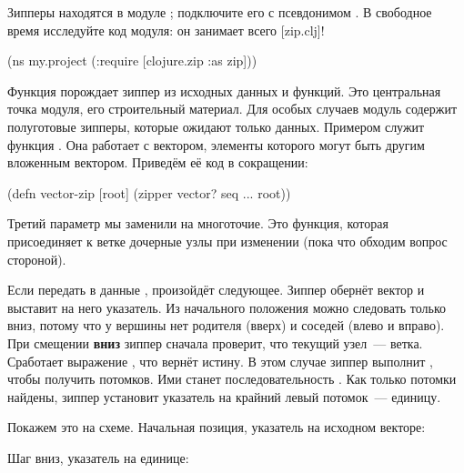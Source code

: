 Зипперы находятся в модуле ; подключите его с псевдонимом
. В свободное время исследуйте код модуля: он занимает всего
[zip.clj]!

\begin{english}
  \begin{clojure}
(ns my.project
  (:require [clojure.zip :as zip]))
  \end{clojure}
\end{english}

Функция  порождает зиппер из исходных данных и функций. Это
центральная точка модуля, его строительный материал. Для особых случаев модуль
содержит полуготовые зипперы, которые ожидают только данных. Примером служит
функция . Она работает с вектором, элементы которого могут быть
другим вложенным вектором. Приведём её код в сокращении:


\begin{english}
  \begin{clojure/lines}
(defn vector-zip
  [root]
  (zipper vector?
          seq
          ...
          root))
  \end{clojure/lines}
\end{english}

Третий параметр  мы заменили на многоточие. Это функция, которая присоединяет к
ветке дочерные узлы при изменении (пока что обходим вопрос стороной).

Если передать в  данные \code{[1 2 3]}, произойдёт
следующее. Зиппер обернёт вектор и выставит на него указатель. Из начального
положения можно следовать только вниз, потому что у вершины нет родителя (вверх)
и соседей (влево и вправо). При смещении \textbf{вниз} зиппер сначала проверит,
что текущий узел~--- ветка. Сработает выражение , что
вернёт истину. В этом случае зиппер выполнит , чтобы
получить потомков. Ими станет последовательность . Как только
потомки найдены, зиппер установит указатель на крайний левый потомок~---
единицу.

Покажем это на схеме. Начальная позиция, указатель на исходном векторе:

\begin{figure}[H]
  \centering
  
  \label{fig:chart-zip-01}
\end{figure}

Шаг вниз, указатель на единице:

